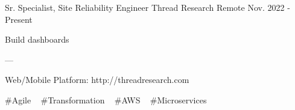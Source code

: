 

\begin{cventries}

  \cventry
    {Sr. Specialist, Site Reliability Engineer} %
    {Thread Research} %
    {Remote} %
    {Nov. 2022 - Present} %
    {
      \begin{cvitems} %
        \item {Build dashboards}
        \item {---}
        \item {Web/Mobile Platform: http://threadresearch.com}
      \end{cvitems}
    }
    {
      \#Agile ~
      \#Transformation ~
      \#AWS ~
      \#Microservices ~
    }


\end{cventries}

